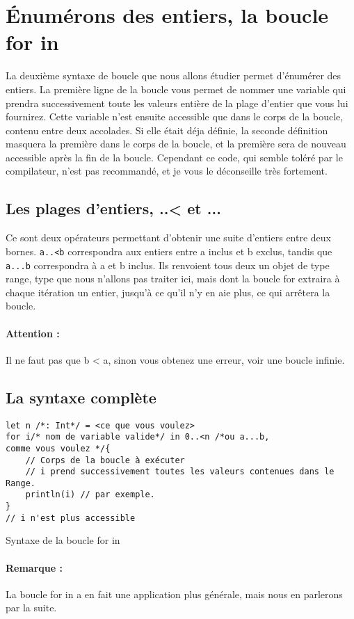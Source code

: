 \section{Énumérons des entiers, la boucle for in}
La deuxième syntaxe de boucle que nous allons étudier permet d'énumérer des entiers.
La première ligne de la boucle vous permet de nommer une variable qui prendra successivement toute les valeurs entière de la plage d'entier que vous lui fournirez.
Cette variable n'est ensuite accessible que dans le corps de la boucle,
contenu entre deux accolades.
Si elle était déja définie,
la seconde définition masquera la première dans le corps de la boucle,
et la première sera de nouveau accessible après la fin de la boucle.
Cependant ce code, qui semble toléré par le compilateur,
n'est pas recommandé, et je vous le déconseille très fortement.
\subsection{Les plages d'entiers, ..< et ...}
Ce sont deux opérateurs permettant d'obtenir une suite d'entiers entre deux bornes. \verb"a..<b" correspondra aux entiers entre a inclus et b exclus, tandis que \verb"a...b" correspondra à a et b inclus. Ils renvoient tous deux un objet de type range, type que nous n'allons pas traiter ici, mais dont la boucle for extraira à chaque itération un entier, jusqu'à ce qu'il n'y en aie plus, ce qui arrêtera la boucle.
\paragraph{Attention :}
Il ne faut pas que b < a, sinon vous obtenez une erreur, voir une boucle infinie. 
\subsection{La syntaxe complète}
\begin{listing}[h]
\begin{verbatim}
let n /*: Int*/ = <ce que vous voulez>
for i/* nom de variable valide*/ in 0..<n /*ou a...b,
comme vous voulez */{
    // Corps de la boucle à exécuter
    // i prend successivement toutes les valeurs contenues dans le Range.
    println(i) // par exemple.
}
// i n'est plus accessible
\end{verbatim}
\caption{Syntaxe de la boucle for in}
\end{listing}
\paragraph{Remarque :}
La boucle for in a en fait une application plus générale, mais nous en parlerons par la suite. %
